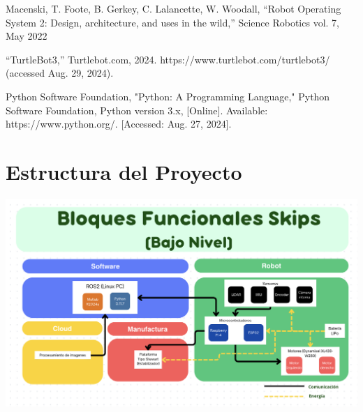 \documentclass[conference]{IEEEtran}
\begin{document}
\begin{thebibliography}{00}
     Macenski, T. Foote, B. Gerkey, C. Lalancette, W. Woodall, “Robot Operating System 2: Design, architecture, and uses in the wild,” Science Robotics vol. 7, May 2022

     “TurtleBot3,” Turtlebot.com, 2024. https://www.turtlebot.com/turtlebot3/ (accessed Aug. 29, 2024).

     Python Software Foundation, "Python: A Programming Language," Python Software Foundation, Python version 3.x, [Online]. Available: https://www.python.org/. [Accessed: Aug. 27, 2024].


\end{thebibliography}


\appendices
\section{Estructura del Proyecto}

\noindent\begin{minipage}{\textwidth}
    \centering
    \includegraphics[width=0.95\linewidth]{diagrama.png}
    \label{fig:diagrama}
\end{minipage}






\vspace{12pt}
\end{document}
